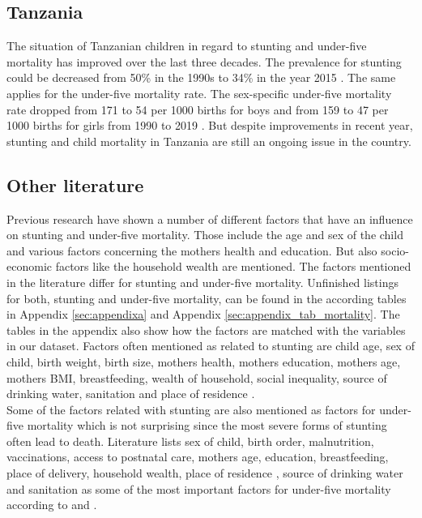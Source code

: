 \documentclass[a4paper, 11pt]{article} %
\begin{document}
\subsection*{Tanzania}
The situation of Tanzanian children in regard to stunting and under-five mortality has improved over the last three decades. The prevalence for stunting could be decreased from 50\% in the 1990s to 34\% in the year 2015 \cite{UNI18}. The same applies for the under-five mortality rate. The sex-specific under-five mortality rate dropped from 171 to 54 per 1000 births for boys and from 159 to 47 per 1000 births for girls from 1990 to 2019 \cite{UN20}. But despite improvements in recent year, stunting and child mortality in Tanzania are still an ongoing issue in the country. 


\subsection*{Other literature}
Previous research have shown a number of different factors that have an influence on stunting and under-five mortality. Those include the age and sex of the child and various factors concerning the mothers health and education. But also socio-economic factors like the household wealth are mentioned. The factors mentioned in the literature differ for stunting and under-five mortality. Unfinished listings for both, stunting and under-five mortality, can be found in the according tables in Appendix \ref{sec:appendixa} and Appendix \ref{sec:appendix_tab_mortality}. The tables in the appendix also show how the factors are matched with the variables in our dataset. Factors often mentioned as related to stunting are child age, sex of child, birth weight, birth size, mothers health, mothers education, mothers age, mothers BMI, breastfeeding, wealth of household, social inequality, source of drinking water, sanitation and place of residence \cite{Akombi2017Aug}\cite{UNI18}. \\

Some of the factors related with stunting are also mentioned as factors for under-five mortality which is not surprising since the most severe forms of stunting often lead to death. Literature lists sex of child, birth order, malnutrition, vaccinations, access to postnatal care, mothers age, education, breastfeeding, place of delivery, household wealth, place of residence , source of drinking water and sanitation as some of the most important factors for under-five mortality according to \cite{Ettarh2012Mar}\cite{Who2020Sep} and \cite{UNICEF2006}. 
\end{document}
